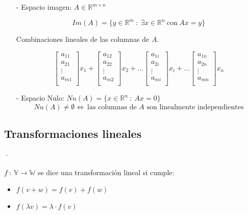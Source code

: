 \begin{itemize}
    \item[-] Espacio imagen: $A \in \mathbb{R}^{m \times n}$ 
    
    \[Im(A) = \{y \in \mathbb{R}^{m} ~:~ \exists x\in \mathbb{R}^{n} ~\text{con}~ Ax = y\}\]
    
    Combinaciones lineales de las columnas de $A$.
    
    \[
    \begin{bmatrix}
    a_{11} \\
    a_{21} \\
    \vdots \\
    a_{m1} \\
    \end{bmatrix}
    x_1 +
    \begin{bmatrix}
    a_{12} \\
    a_{22} \\
    \vdots \\
    a_{m2} \\
    \end{bmatrix}
    x_2 + \ldots
    \begin{bmatrix}
    a_{1i} \\
    a_{2i} \\
    \vdots \\
    a_{mi} \\
    \end{bmatrix}
    x_i + \ldots
    \begin{bmatrix}
    a_{1n} \\
    a_{2n} \\
    \vdots \\
    a_{mn} \\
    \end{bmatrix}
    x_n
    \]
    
    \item[-] Espacio Nulo: $Nu(A) = \{x \in \mathbb{R}^{n} ~:~ Ax = 0\}$
    \[Nu(A) \neq \emptyset \iff ~\text{las columnas de $A$ son linealmente independientes}\]    
\end{itemize}

\subsection{Transformaciones lineales}
·\label{subsec:transformaciones_lineales}

$f ~:~ \mathbb{V} \to \mathbb{W}$  se dice una transformación lineal si cumple:

\begin{itemize}
    \item $f(v + w) = f(v) + f(w)$
    \item $f(\lambda v) = \lambda \cdot f(v)$
\end{itemize}

